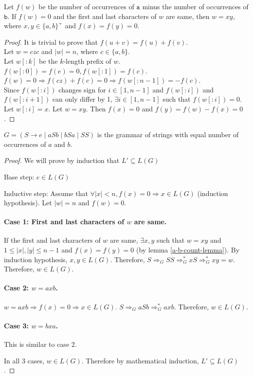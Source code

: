 \begin{lemma}
\label{a-b-count-lemma}
Let $f(w)$ be the number of occurrences of $\texttt{a}$ minus the number of occurrences of $\texttt{b}$.
If $f(w) = 0$ and the first and last characters of $w$ are same, then
$w = xy$, where $x, y \in \{a, b\}^+$ and $f(x) = f(y) = 0$.
\end{lemma}
\begin{proof}
It is trivial to prove that $f(u + v) = f(u) + f(v)$.\\
Let $w = czc$ and $|w| = n$, where $c \in \{a, b\}$.\\
Let $w[:k]$ be the $k$-length prefix of $w$.\\
$f(w[:0]) = f(e) = 0, f(w[:1]) = f(c)$.\\
$f(w) = 0 \Rightarrow f(cz) + f(c) = 0 \Rightarrow f(w[:n-1]) = -f(c)$.\\
Since $f(w[:i])$ changes sign for $i \in [1, n-1]$ and $f(w[:i])$ and $f(w[:i+1])$
can only differ by 1, $\exists i \in [1, n-1]$ such that $f(w[:i]) = 0$.\\
Let $w[:i] = x$. Let $w = xy$.
Then $f(x) = 0$ and $f(y) = f(w) - f(x) = 0$.
\end{proof}

\begin{theorem}
$G = (S \rightarrow e \mid aSb \mid bSa \mid SS)$ is the grammar of strings with
equal number of occurrences of $a$ and $b$.
\end{theorem}
\begin{proof}
We will prove by induction that $L' \subseteq L(G)$

Base step: $e \in L(G)$

Inductive step:
Assume that $\forall |x| < n, f(x) = 0 \Rightarrow x \in L(G)$ (induction hypothesis).
Let $|w| = n$ and $f(w) = 0$.

\paragraph{Case 1: First and last characters of $w$ are same.}
If the first and last characters of $w$ are same,
$\exists x, y$ such that $w = xy$ and $1 \le |x|, |y| \le n-1$ and $f(x) = f(y) = 0$ (by lemma \ref{a-b-count-lemma}).
By induction hypothesis, $x, y \in L(G)$.
Therefore, $S \Rightarrow_G SS \Rightarrow_G^* xS \Rightarrow_G^* xy = w$.
Therefore, $w \in L(G)$.

\paragraph{Case 2: $w = axb$.}
$w = axb \Rightarrow f(x) = 0 \Rightarrow x \in L(G)$.
$S \Rightarrow_G aSb \Rightarrow_G^* axb$.
Therefore, $w \in L(G)$.

\paragraph{Case 3: $w = bxa$.}
This is similar to case 2.

In all 3 cases, $w \in L(G)$.
Therefore by mathematical induction, $L' \subseteq L(G)$.
\end{proof}


